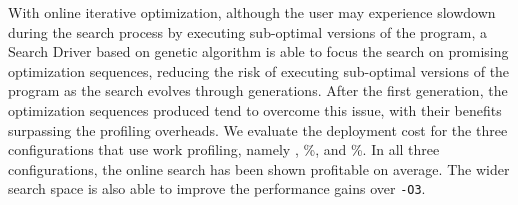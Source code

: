 With online iterative optimization, although the 
user may experience slowdown during the search process by executing sub-optimal versions of the program,
a Search Driver based on genetic algorithm is able to focus the search on promising optimization sequences, reducing the risk of
executing sub-optimal versions of the program as the search evolves through generations.
After the first generation, the optimization sequences produced tend to overcome this issue, with their benefits surpassing the profiling overheads.
We evaluate the deployment cost for the three configurations that use work profiling, namely \OptProf, \%, and \%.
In all three configurations, the online search has been shown profitable on average.
The wider search space is also able to improve the performance gains over \texttt{-O3}.

